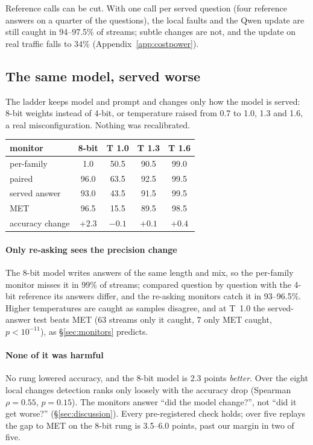 \documentclass[11pt]{article}
\begin{document}
Reference calls can be cut. With one call per served question (four reference
answers on a quarter of the questions), the local faults and the Qwen update are
still caught in 94--97.5\% of streams; subtle changes are not, and the update on real
traffic falls to 34\% (Appendix~\ref{app:costpower}).

\subsection{The same model, served worse}
\label{sec:ladder}

The ladder keeps model and prompt and changes only how the model is served: 8-bit
weights instead of 4-bit, or temperature raised from 0.7 to 1.0, 1.3 and 1.6, a real
misconfiguration. Nothing was recalibrated.

\begin{center}\small
\setlength{\tabcolsep}{4pt}
\begin{tabular}{lcccc}
  \toprule
  monitor & 8-bit & T 1.0 & T 1.3 & T 1.6 \\
  \midrule
  per-family & 1.0 & 50.5 & 90.5 & 99.0 \\
  paired & 96.0 & 63.5 & 92.5 & 99.5 \\
  served answer & 93.0 & 43.5 & 91.5 & 99.5 \\
  MET & 96.5 & 15.5 & 89.5 & 98.5 \\
  \midrule
  accuracy change & $+2.3$ & $-0.1$ & $+0.1$ & $+0.4$ \\
  \bottomrule
\end{tabular}
\end{center}

\paragraph{Only re-asking sees the precision change} The 8-bit model writes answers
of the same length and mix, so the per-family monitor misses it in 99\% of streams;
compared question by question with the 4-bit reference its answers differ, and the
re-asking monitors catch it in 93--96.5\%. Higher temperatures are caught as samples
disagree, and at T~1.0 the served-answer test beats MET (63 streams only it caught,
7 only MET caught, $p<10^{-11}$), as \S\ref{sec:monitors} predicts.

\paragraph{None of it was harmful} No rung lowered accuracy, and the 8-bit model is
2.3 points \emph{better}. Over the eight local changes detection ranks only loosely
with the accuracy drop (Spearman $\rho=0.55$, $p=0.15$). The monitors answer ``did
the model change?'', not ``did it get worse?'' (\S\ref{sec:discussion}). Every
pre-registered check holds; over five replays the gap to MET on the 8-bit rung is
3.5--6.0 points, past our margin in two of five.
\end{document}
